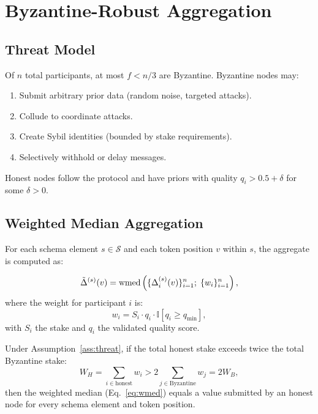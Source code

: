 \section{Byzantine-Robust Aggregation}

\label{sec:aggregation}

\subsection{Threat Model}

\begin{assumption}
\label{ass:threat}
Of $n$ total participants, at most $f < n/3$ are Byzantine. Byzantine nodes may:
\begin{enumerate}[leftmargin=1.5em]
    \item Submit arbitrary prior data (random noise, targeted attacks).
    \item Collude to coordinate attacks.
    \item Create Sybil identities (bounded by stake requirements).
    \item Selectively withhold or delay messages.
\end{enumerate}
Honest nodes follow the protocol and have priors with quality $q_i > 0.5 + \delta$
for some $\delta > 0$.
\end{assumption}

\subsection{Weighted Median Aggregation}

For each schema element $s \in \mathcal{S}$ and each token position $v$ within
$s$, the aggregate is computed as:

\begin{equation}
    \tilde{\Delta}^{(s)}(v) = \operatorname{wmed}\left(\{\Delta_i^{(s)}(v)\}_{i=1}^n; \; \{w_i\}_{i=1}^n\right),
    \label{eq:wmed}
\end{equation}
where the weight for participant $i$ is:
\begin{equation}
    w_i = S_i \cdot q_i \cdot \mathbb{I}[q_i \geq q_{\min}],
    \label{eq:weights}
\end{equation}
with $S_i$ the stake and $q_i$ the validated quality score.

\begin{theorem}
\label{thm:byz-robust}
Under Assumption~\ref{ass:threat}, if the total honest stake exceeds twice the
total Byzantine stake:
\begin{equation}
    W_H = \sum_{i \in \text{honest}} w_i > 2 \sum_{j \in \text{Byzantine}} w_j = 2W_B,
\end{equation}
then the weighted median (Eq.~\ref{eq:wmed}) equals a value submitted by an
honest node for every schema element and token position.
\end{theorem}

